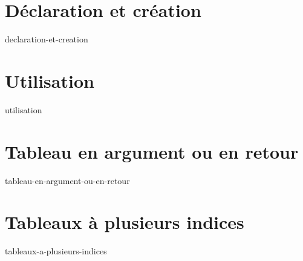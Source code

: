 \section{Déclaration et création}\label{sec:declaration-et-creation}
    {declaration-et-creation}

\section{Utilisation}
    {utilisation}

\section{Tableau en argument ou en retour}\label{sec:tableau-en-argument-ou-en-retour}
    {tableau-en-argument-ou-en-retour}

\section{Tableaux à plusieurs indices}\label{sec:tableaux-a-plusieurs-indices}
    {tableaux-a-plusieurs-indices}